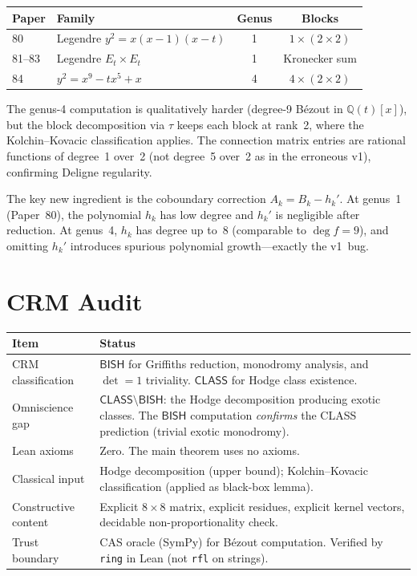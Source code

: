 \documentclass[11pt]{article}
\theoremstyle{plain}
\theoremstyle{definition}
\theoremstyle{remark}
\newcommand{\Q}{\mathbb{Q}}
\newcommand{\BISH}{\ensuremath{\mathsf{BISH}}}
\newcommand{\CLASS}{\ensuremath{\mathsf{CLASS}}}
\begin{document}
\begin{center}
\begin{tabular}{llcc}
\toprule
Paper & Family & Genus & Blocks \\
\midrule
80 & Legendre $y^2 = x(x-1)(x-t)$ & 1 & $1 \times (2 \times 2)$ \\
81--83 & Legendre $E_t \times E_t$ & 1 & Kronecker sum \\
84 & $y^2 = x^9 - tx^5 + x$ & 4 & $4 \times (2 \times 2)$ \\
\bottomrule
\end{tabular}
\end{center}

The genus-4 computation is qualitatively harder (degree-9 B\'ezout
in $\Q(t)[x]$), but the block decomposition via $\tau$ keeps each
block at rank~2, where the Kolchin--Kovacic classification applies.
The connection matrix entries are rational functions of degree~1
over~2 (not degree~5 over~2 as in the erroneous v1), confirming
Deligne regularity.

The key new ingredient is the coboundary correction $A_k = B_k - h_k'$.
At genus~1 (Paper~80), the polynomial $h_k$ has low degree and
$h_k'$ is negligible after reduction. At genus~4, $h_k$ has degree
up to~8 (comparable to $\deg f = 9$), and omitting $h_k'$ introduces
spurious polynomial growth---exactly the v1~bug.

\section{CRM Audit}\label{sec:audit}

\begin{center}
\begin{tabular}{lp{7cm}}
\toprule
\textbf{Item} & \textbf{Status} \\
\midrule
CRM classification & $\BISH$ for Griffiths reduction, monodromy
  analysis, and $\det = 1$ triviality. $\CLASS$ for Hodge class
  existence. \\
Omniscience gap & $\CLASS \setminus \BISH$: the Hodge decomposition
  producing exotic classes. The $\BISH$ computation \emph{confirms}
  the CLASS prediction (trivial exotic monodromy). \\
Lean axioms & Zero. The main theorem uses no axioms. \\
Classical input & Hodge decomposition (upper bound);
  Kolchin--Kovacic classification (applied as black-box lemma). \\
Constructive content & Explicit $8 \times 8$ matrix, explicit
  residues, explicit kernel vectors, decidable
  non-proportionality check. \\
Trust boundary & CAS oracle (SymPy) for B\'ezout computation.
  Verified by \texttt{ring} in Lean (not \texttt{rfl} on strings). \\
\bottomrule
\end{tabular}
\end{center}
\end{document}
